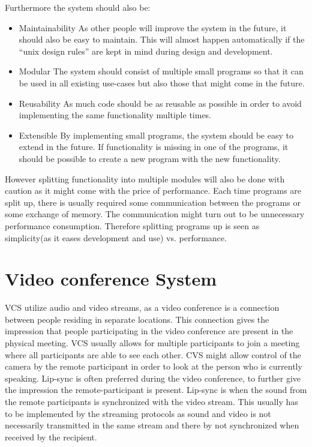 
Furthermore the system should also be:

\begin{itemize}
	\item Maintainability
As other people will improve the system in the future, it should also be easy to maintain. This will almost happen automatically if the “unix design rules” are kept in mind during design and development.
\item Modular
The system should consist of multiple small programs so that it can be used in all existing use-cases but also those that might come in the future.
\item Reusability
As much code should be as reusable as possible in order to avoid implementing the same functionality multiple times.
\item Extensible
    By implementing small programs, the system should be easy to extend in the future.
    If functionality is missing in one of the programs, it should be possible to create a new 
    program with the new functionality.
\end{itemize}

However splitting functionality into multiple modules will also be done with caution as it might come with the price of performance. Each time programs are split up, there is usually required some communication between the programs or some exchange of memory. The communication might turn out to be unnecessary performance consumption. Therefore splitting programs up is seen as simplicity(as it eases development and use) vs. performance.







\section{Video conference System}
\ac{VCS} utilize audio and video streams, as a video conference is a connection between people residing in separate locations. This connection gives the impression that people participating in the video conference are present in the physical meeting. VCS usually allows for multiple participants to join a meeting where all participants are able to see each other. CVS might allow control of the camera by the remote participant in order to look at the person who is currently speaking. 
Lip-sync is often preferred during the video conference, to further give the impression the remote-participant is present. Lip-sync is when the sound from the remote participants is synchronized with the video stream. This usually has to be implemented by the streaming protocols as sound and video is not necessarily transmitted in the same stream and there by not synchronized when received by the recipient.

